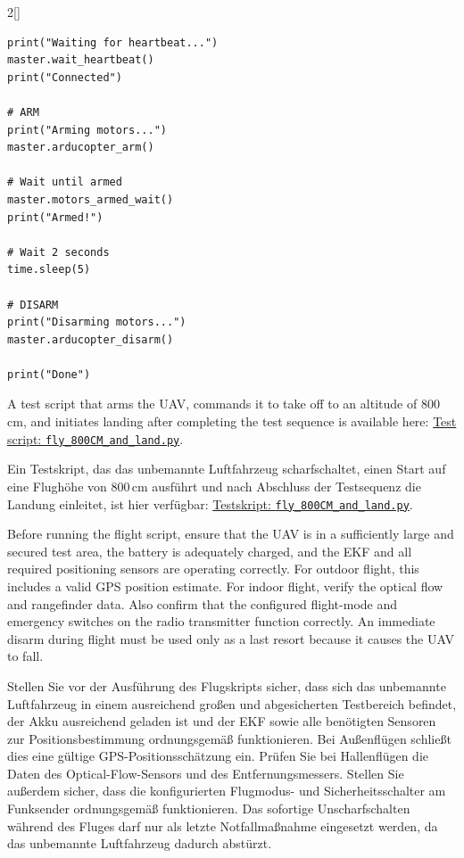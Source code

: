 \begin{paracol}{2}[]
\begin{lstlisting}[style=shell]
print("Waiting for heartbeat...")
master.wait_heartbeat()
print("Connected")

# ARM
print("Arming motors...")
master.arducopter_arm()

# Wait until armed
master.motors_armed_wait()
print("Armed!")

# Wait 2 seconds
time.sleep(5)

# DISARM
print("Disarming motors...")
master.arducopter_disarm()

print("Done")
\end{lstlisting}

\colstart

A test script that arms the UAV, commands it to take off to an altitude of 800\,cm, and initiates landing after completing the test sequence is available here: \href{https://github.com/christianbaun/aidrones/blob/main/src/companion/fly_800CM_and_land.py}{Test script: \texttt{fly\_800CM\_and\_land.py}}.

\colger

Ein Testskript, das das unbemannte Luftfahrzeug scharfschaltet, einen Start auf eine Flughöhe von 800\,cm ausführt und nach Abschluss der Testsequenz die Landung einleitet, ist hier verfügbar: \href{https://github.com/christianbaun/aidrones/blob/main/src/companion/fly_800CM_and_land.py}{Testskript: \texttt{fly\_800CM\_and\_land.py}}.

\coleng

Before running the flight script, ensure that the UAV is in a sufficiently large and secured test area, the battery is adequately charged, and the EKF and all required positioning sensors are operating correctly. For outdoor flight, this includes a valid GPS position estimate. For indoor flight, verify the optical flow and rangefinder data. Also confirm that the configured flight-mode and emergency switches on the radio transmitter function correctly. An immediate disarm during flight must be used only as a last resort because it causes the UAV to fall.

\colger

Stellen Sie vor der Ausführung des Flugskripts sicher, dass sich das unbemannte Luftfahrzeug in einem ausreichend großen und abgesicherten Testbereich befindet, der Akku ausreichend geladen ist und der EKF sowie alle benötigten Sensoren zur Positionsbestimmung ordnungsgemäß funktionieren. Bei Außenflügen schließt dies eine gültige GPS-Positionsschätzung ein. Prüfen Sie bei Hallenflügen die Daten des Optical-Flow-Sensors und des Entfernungsmessers. Stellen Sie außerdem sicher, dass die konfigurierten Flugmodus- und Sicherheitsschalter am Funksender ordnungsgemäß funktionieren. Das sofortige Unscharfschalten während des Fluges darf nur als letzte Notfallmaßnahme eingesetzt werden, da das unbemannte Luftfahrzeug dadurch abstürzt.


\end{paracol}
